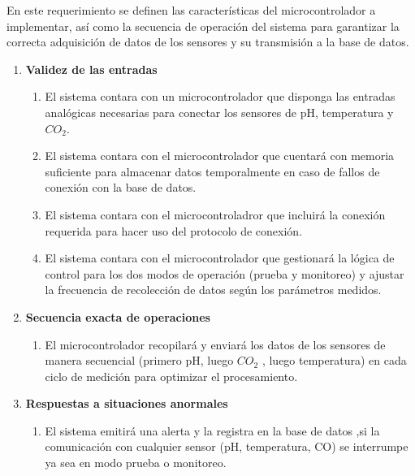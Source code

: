 \begin{enumerate}
        En este requerimiento se definen las características del microcontrolador a implementar,
        así como la secuencia de operación del sistema para garantizar la correcta adquisición
        de datos de los sensores y su transmisión a la base de datos.

        \begin{enumerate}
            \item \textbf{Validez de las entradas}
                \begin{enumerate}
                    \item El sistema contara con un microcontrolador que disponga las entradas analógicas necesarias para conectar los sensores de pH, temperatura y $CO_{2}$.
                    \item El sistema contara con el microcontrolador que cuentará con memoria suficiente para almacenar datos temporalmente en caso de fallos de conexión con la base de datos.
                    \item El sistema contara con el microcontroladror que incluirá la conexión requerida para hacer uso del protocolo de conexión.
                    \item El sistema contara con el microcontrolador que gestionará la lógica de control para los dos modos de operación (prueba y monitoreo) y ajustar la frecuencia de recolección de datos según los parámetros medidos.
                \end{enumerate}   
            
            \item \textbf{Secuencia exacta de operaciones}
                \begin{enumerate}
                    \item El microcontrolador recopilará y enviará los datos de los sensores de manera secuencial (primero pH, luego $CO_{2}$ , luego temperatura) en cada ciclo de medición para optimizar el procesamiento.
                \end{enumerate}   
        
            \item \textbf{Respuestas a situaciones anormales}
                \begin{enumerate}
                    \item El sistema emitirá una alerta y la registra en la base de datos ,si la comunicación con cualquier sensor (pH, temperatura, CO) se interrumpe ya sea en modo prueba o monitoreo.
                \end{enumerate}   
       

\end{enumerate}
\end{enumerate}
